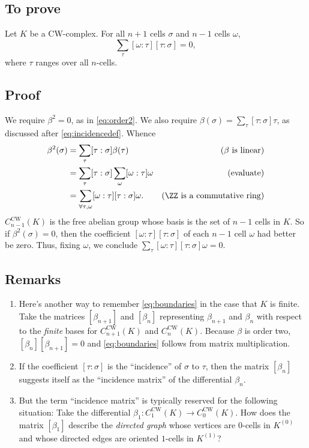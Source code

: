 \documentclass[10pt]{amsart}
\let\subsubsection\subsection
\let\subsection\section
\let\section\chapter
\let\chapter\part
\begin{document}
\subsubsection{To prove}

Let \(K\) be a CW-complex. For all \(n+1\) cells \(\sigma\) and \(n-1\)
cells \(\omega\),
\begin{equation}\label{eq:boundaries}\sum_\tau [\omega : \tau][\tau : \sigma] = 0,\end{equation}
where \(\tau\) ranges over all \(n\)-cells.

\subsubsection{Proof}

We require \(\beta^2 = 0\), as in \eqref{eq:order2}. We also require
\(\beta(\sigma) = \sum_\tau [\tau: \sigma]\tau\), as discussed after
\eqref{eq:incidencedef}. Whence \begin{align*}
\beta^2(\sigma) & = \sum_\tau [\tau : \sigma] \beta(\tau) & \text{($\beta$ is linear)}\\
    & = \sum_\tau [\tau : \sigma] \sum_\omega [\omega: \tau]\omega & \text{(evaluate)}\\
    & = \displaystyle{\sum_{\forall \tau, \omega}[\omega : \tau][\tau : \sigma] \omega}. & \text{($\ZZ$ is a commutative ring)}
\end{align*} \(C^{\text{CW}}_{n-1}(K)\) is the free abelian group whose
basis is the set of \(n-1\) cells in \(K\). So if
\(\beta^2(\sigma) = 0\), then the coefficient
\([\omega:\tau][\tau:\sigma]\) of each \(n-1\) cell \(\omega\) had
better be zero. Thus, fixing \(\omega\), we conclude
\(\sum_{\tau}[\omega : \tau][\tau : \sigma] \omega = 0\). \qedsymbol

\subsubsection{Remarks}

\begin{enumerate}
\def\labelenumi{\roman{enumi}.}
\item
  Here's another way to remember \eqref{eq:boundaries} in the case that
  \(K\) is finite. Take the matrices \([\beta_{n+1}]\) and \([\beta_n]\)
  representing \(\beta_{n+1}\) and \(\beta_n\) with respect to the
  \emph{finite} bases for \(C^{\text{CW}}_{n+1}(K)\) and
  \(C^{\text{CW}}_n(K)\). Because \(\beta\) is order two,
  \([\beta_{n}][\beta_{n+1}] = 0\) and \eqref{eq:boundaries} follows
  from matrix multiplication.
\item
  If the coefficient \([\tau : \sigma]\) is the ``incidence'' of
  \(\sigma\) to \(\tau\), then the matrix \([\beta_n]\) suggests itself
  as the ``incidence matrix'' of the differential \(\beta_n\).
\item
  But the term ``incidence matrix'' is typically reserved for the
  following situation: Take the differential
  \(\beta_1 \colon C^{\text{CW}}_1(K) \to C^{\text{CW}}_0(K)\). How does
  the matrix \([\beta_1]\) describe the \emph{directed graph} whose
  vertices are \(0\)-cells in \(K^{( 0 )}\) and whose directed edges are oriented
  \(1\)-cells in \(K^{( 1 )}\)?
\end{enumerate}
\end{document}

